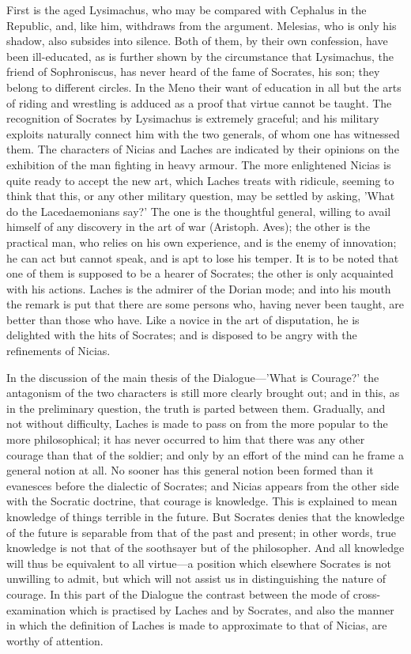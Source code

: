 \documentclass[11pt,letter]{article}
\begin{document}
\par  First is the aged Lysimachus, who may be compared with Cephalus in the Republic, and, like him, withdraws from the argument. Melesias, who is only his shadow, also subsides into silence. Both of them, by their own confession, have been ill-educated, as is further shown by the circumstance that Lysimachus, the friend of Sophroniscus, has never heard of the fame of Socrates, his son; they belong to different circles. In the Meno their want of education in all but the arts of riding and wrestling is adduced as a proof that virtue cannot be taught. The recognition of Socrates by Lysimachus is extremely graceful; and his military exploits naturally connect him with the two generals, of whom one has witnessed them. The characters of Nicias and Laches are indicated by their opinions on the exhibition of the man fighting in heavy armour. The more enlightened Nicias is quite ready to accept the new art, which Laches treats with ridicule, seeming to think that this, or any other military question, may be settled by asking, 'What do the Lacedaemonians say?' The one is the thoughtful general, willing to avail himself of any discovery in the art of war (Aristoph. Aves); the other is the practical man, who relies on his own experience, and is the enemy of innovation; he can act but cannot speak, and is apt to lose his temper. It is to be noted that one of them is supposed to be a hearer of Socrates; the other is only acquainted with his actions. Laches is the admirer of the Dorian mode; and into his mouth the remark is put that there are some persons who, having never been taught, are better than those who have. Like a novice in the art of disputation, he is delighted with the hits of Socrates; and is disposed to be angry with the refinements of Nicias.

\par  In the discussion of the main thesis of the Dialogue—'What is Courage?' the antagonism of the two characters is still more clearly brought out; and in this, as in the preliminary question, the truth is parted between them. Gradually, and not without difficulty, Laches is made to pass on from the more popular to the more philosophical; it has never occurred to him that there was any other courage than that of the soldier; and only by an effort of the mind can he frame a general notion at all. No sooner has this general notion been formed than it evanesces before the dialectic of Socrates; and Nicias appears from the other side with the Socratic doctrine, that courage is knowledge. This is explained to mean knowledge of things terrible in the future. But Socrates denies that the knowledge of the future is separable from that of the past and present; in other words, true knowledge is not that of the soothsayer but of the philosopher. And all knowledge will thus be equivalent to all virtue—a position which elsewhere Socrates is not unwilling to admit, but which will not assist us in distinguishing the nature of courage. In this part of the Dialogue the contrast between the mode of cross-examination which is practised by Laches and by Socrates, and also the manner in which the definition of Laches is made to approximate to that of Nicias, are worthy of attention.
\end{document}
